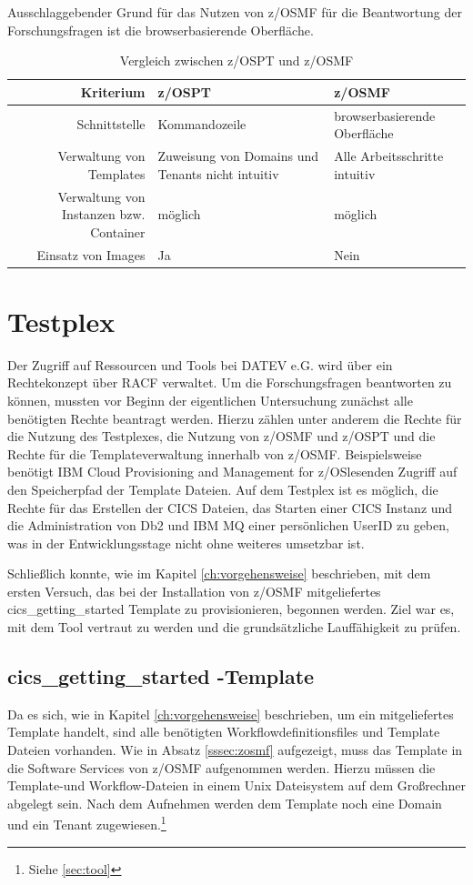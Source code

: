 Ausschlaggebender Grund für das Nutzen von z/OSMF für die Beantwortung der Forschungsfragen ist die browserbasierende Oberfläche.
\begin{table}
\centering
\begin{tabularx}{\textwidth}{r|X|X}
Kriterium & z/OSPT & z/OSMF\\
\hline
Schnittstelle & Kommandozeile & browserbasierende Oberfläche\\
\hline
Verwaltung von Templates & Zuweisung von Domains und Tenants nicht intuitiv & Alle Arbeitsschritte intuitiv\\
\hline
Verwaltung von Instanzen bzw. Container &  möglich & möglich\\
\hline
Einsatz von Images & Ja & Nein\\
\end{tabularx}
\caption{Vergleich zwischen z/OSPT und z/OSMF}
\label{tab:vglzosptzosmf}
\end{table}

\section{Testplex}
Der Zugriff auf Ressourcen und Tools bei DATEV e.G. wird über ein Rechtekonzept über RACF verwaltet. 
Um die Forschungsfragen beantworten zu können, mussten vor Beginn der eigentlichen Untersuchung zunächst alle benötigten Rechte beantragt werden.
Hierzu zählen unter anderem die Rechte für die Nutzung des Testplexes, die Nutzung von z/OSMF und z/OSPT und die Rechte für die Templateverwaltung innerhalb von z/OSMF. 
Beispielsweise benötigt \glqq IBM Cloud Provisioning and Management for z/OS\grqq lesenden Zugriff auf den Speicherpfad der Template Dateien.
Auf dem Testplex ist es  möglich, die Rechte für das Erstellen der CICS Dateien, das Starten einer CICS Instanz und die Administration von Db2 und IBM MQ einer persönlichen UserID zu geben, was in der Entwicklungsstage nicht ohne weiteres umsetzbar ist. 

Schließlich konnte, wie im Kapitel \ref{ch:vorgehensweise} beschrieben, mit dem ersten Versuch, das bei der Installation von z/OSMF mitgeliefertes \glqq cics\_getting\_started\grqq{} Template zu provisionieren, begonnen werden.
Ziel war es, mit dem Tool vertraut zu werden und die grundsätzliche Lauffähigkeit zu prüfen.

\subsection{\glqq cics\_getting\_started \grqq-Template}\label{ssec:cgs}
Da es sich, wie in Kapitel \ref{ch:vorgehensweise} beschrieben, um ein mitgeliefertes Template handelt, sind alle benötigten Workflowdefinitionsfiles und Template Dateien vorhanden.
Wie in Absatz \ref{sssec:zosmf} aufgezeigt, muss das Template in die Software Services von z/OSMF aufgenommen werden.
Hierzu müssen die Template-und Workflow-Dateien in einem Unix Dateisystem auf dem Großrechner abgelegt sein. 
Nach dem Aufnehmen werden dem Template noch eine Domain und ein Tenant zugewiesen.\footnote{Siehe \ref{sec:tool}}

